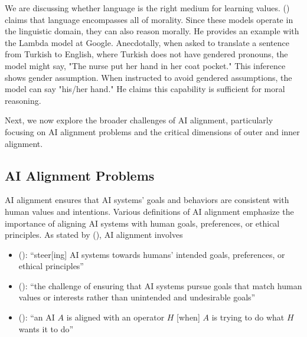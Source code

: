 \documentclass[
  letterpaper,
  numbers=noenddot,
  DIV=11]{scrreprt}
\theoremstyle{definition}
\theoremstyle{plain}
\theoremstyle{plain}
\theoremstyle{remark}
\begin{document}
We are discussing whether language is the right medium for learning
values. () claims that language
encompasses all of morality. Since these models operate in the
linguistic domain, they can also reason morally. He provides an example
with the Lambda model at Google. Anecdotally, when asked to translate a
sentence from Turkish to English, where Turkish does not have gendered
pronouns, the model might say, "The nurse put her hand in her coat
pocket." This inference shows gender assumption. When instructed to
avoid gendered assumptions, the model can say "his/her hand." He claims
this capability is sufficient for moral reasoning.

Next, we now explore the broader challenges of AI alignment,
particularly focusing on AI alignment problems and the critical
dimensions of outer and inner alignment.

\subsection{AI Alignment Problems}\label{ai-alignment-problems}

AI alignment ensures that AI systems' goals and behaviors are consistent
with human values and intentions. Various definitions of AI alignment
emphasize the importance of aligning AI systems with human goals,
preferences, or ethical principles. As stated by
(), AI
alignment involves

\begin{itemize}
\item
  ():
  ``steer{[}ing{]} AI systems towards humans' intended goals,
  preferences, or ethical principles''
\item
  ():
  ``the challenge of ensuring that AI systems pursue goals that match
  human values or interests rather than unintended and undesirable
  goals''
\item
  (): ``an AI
  \(A\) is aligned with an operator \(H\) {[}when{]} \(A\) is trying to
  do what \(H\) wants it to do''
\end{itemize}
\end{document}
